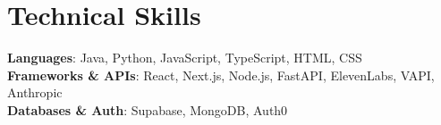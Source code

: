 \documentclass[letterpaper,11pt]{article}
\begin{document}
\section{Technical Skills}
 \begin{itemize}[leftmargin=0.15in, label={}]
    \small{\item{
     \textbf{Languages}{: Java, Python, JavaScript, TypeScript, HTML, CSS} \\
     \textbf{Frameworks \& APIs}{: React, Next.js, Node.js, FastAPI, ElevenLabs, VAPI, Anthropic} \\
     \textbf{Databases \& Auth}{: Supabase, MongoDB, Auth0}
    }}
 \end{itemize}


\end{document}
